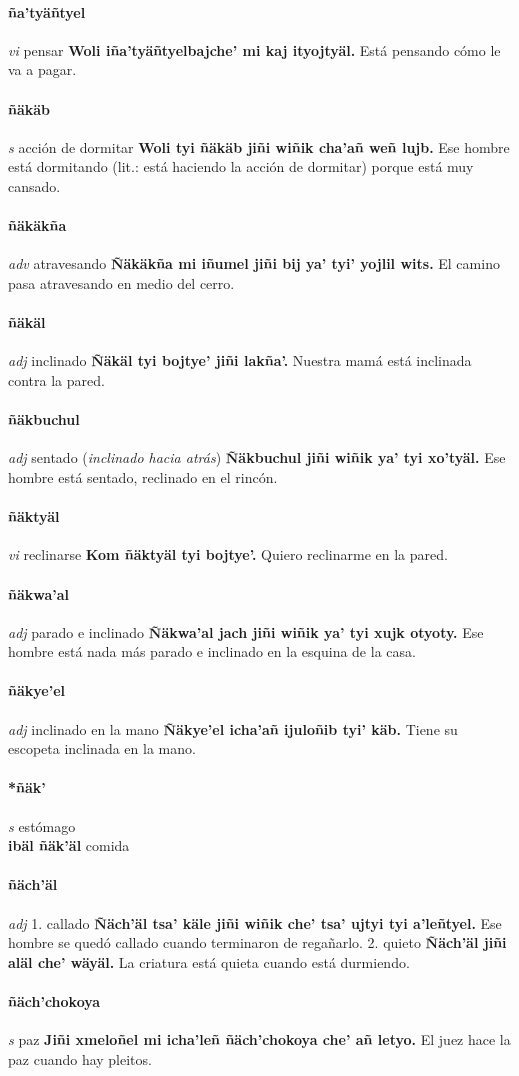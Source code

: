 \documentclass{scrbook}
\newcommand{\entry}[1]{\paragraph{#1}}
\newcommand{\onedefinition}[1]{#1.}
\newcommand{\partofspeech}[1]{\textit{#1}}
\newcommand{\spanishtranslation}[1]{#1}
\newcommand{\clarification}[1]{(\textit{#1})}
\newcommand{\cholexample}[1]{\textbf{#1}}
\newcommand{\exampletranslation}[1]{#1}
\newcommand{\secondaryentry}[1]{\\\textbf{#1}}
\newcommand{\secondtranslation}[1]{#1}
\begin{document}
\begin{multicols}{2}
\entry{ña'tyäñtyel}
\partofspeech{vi}
\spanishtranslation{pensar}
\cholexample{Woli iña'tyäñtyelbajche' mi kaj ityojtyäl.}
\exampletranslation{Está pensando cómo le va a pagar.}

\entry{ñäkäb}
\partofspeech{s}
\spanishtranslation{acción de dormitar}
\cholexample{Woli tyi ñäkäb jiñi wiñik cha'añ weñ lujb.}
\exampletranslation{Ese hombre está dormitando (lit.: está haciendo la acción de dormitar) porque está muy cansado.}

\entry{ñäkäkña}
\partofspeech{adv}
\spanishtranslation{atravesando}
\cholexample{Ñäkäkña mi iñumel jiñi bij ya' tyi' yojlil wits.}
\exampletranslation{El camino pasa atravesando en medio del cerro.}

\entry{ñäkäl}
\partofspeech{adj}
\spanishtranslation{inclinado}
\cholexample{Ñäkäl tyi bojtye' jiñi lakña'.}
\exampletranslation{Nuestra mamá está inclinada contra la pared.}

\entry{ñäkbuchul}
\partofspeech{adj}
\spanishtranslation{sentado}
\clarification{inclinado hacia atrás}
\cholexample{Ñäkbuchul jiñi wiñik ya' tyi xo'tyäl.}
\exampletranslation{Ese hombre está sentado, reclinado en el rincón.}

\entry{ñäktyäl}
\partofspeech{vi}
\spanishtranslation{reclinarse}
\cholexample{Kom ñäktyäl tyi bojtye'.}
\exampletranslation{Quiero reclinarme en la pared.}

\entry{ñäkwa'al}
\partofspeech{adj}
\spanishtranslation{parado e inclinado}
\cholexample{Ñäkwa'al jach jiñi wiñik ya' tyi xujk otyoty.}
\exampletranslation{Ese hombre está nada más parado e inclinado en la esquina de la casa.}

\entry{ñäkye'el}
\partofspeech{adj}
\spanishtranslation{inclinado en la mano}
\cholexample{Ñäkye'el icha'añ ijuloñib tyi' käb.}
\exampletranslation{Tiene su escopeta inclinada en la mano.}

\entry{*ñäk'}
\partofspeech{s}
\spanishtranslation{estómago}
\secondaryentry{ibäl ñäk'äl}
\secondtranslation{comida}

\entry{ñäch'äl}
\partofspeech{adj}
\onedefinition{1}
\spanishtranslation{callado}
\cholexample{Ñäch'äl tsa' käle jiñi wiñik che' tsa' ujtyi tyi a'leñtyel.}
\exampletranslation{Ese hombre se quedó callado cuando terminaron de regañarlo.}
\onedefinition{2}
\spanishtranslation{quieto}
\cholexample{Ñäch'äl jiñi aläl che' wäyäl.}
\exampletranslation{La criatura está quieta cuando está durmiendo.}

\entry{ñäch'chokoya}
\partofspeech{s}
\spanishtranslation{paz}
\cholexample{Jiñi xmeloñel mi icha'leñ ñäch'chokoya che' añ letyo.}
\exampletranslation{El juez hace la paz cuando hay pleitos.}


\end{multicols}
\end{document}
